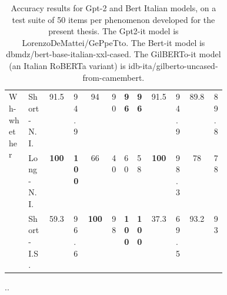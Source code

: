 \begin{table}
\begin{center}
\begin{tabular}{p{0.095\linewidth}|p{0.099\linewidth}|c|p{0.04\linewidth}|c|p{0.04\linewidth}|p{0.04\linewidth}|p{0.04\linewidth}|c|p{0.04\linewidth}|c|p{0.04\linewidth}|}
		  	\multirow{3}{0.8cm}{Wh-whether} 
		  				& Short-N.I. & 91.5 & 94.9 & 94 & 90 & \textbf{96} & \textbf{96} & 91.5 & 94.9 & 89.8 & 89.8 \\ 
					  	& Long-N.I. & \textbf{100} & \textbf{100} & 66 & 40 & 60 & 58 & \textbf{100} & 98.3 & 78 & 78 \\ 
		  				& Short-I.S. & 59.3 & 96.6 & \textbf{100} & 98 & \textbf{100} & \textbf{100} & 37.3 & 69.5 & 93.2 & 93 \\ 		  	
		\end{tabular}
		\caption{Accuracy results for Gpt-2 and Bert Italian models, on a test suite of 50 items per phenomenon developed for the present thesis. The Gpt2-it model is LorenzoDeMattei/GePpeTto. The Bert-it model is dbmdz/bert-base-italian-xxl-cased. The GilBERTo-it model (an Italian RoBERTa variant) is idb-ita/gilberto-uncased-from-camembert.}
		\label{tab:accuracy_it_data}
	\end{center}
\end{table}

..


